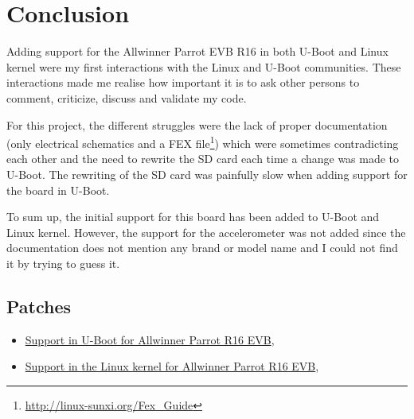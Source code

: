 \section{Conclusion}

Adding support for the Allwinner Parrot EVB R16 in both U-Boot and Linux kernel were my first interactions with the Linux and U-Boot communities. These interactions made me realise how important it is to ask other persons to comment, criticize, discuss and validate my code.

For this project, the different struggles were the lack of proper documentation (only electrical schematics and a FEX file\footnote{\url{http://linux-sunxi.org/Fex\_Guide}}) which were sometimes contradicting each other and the need to rewrite the SD card each time a change was made to U-Boot. The rewriting of the SD card was painfully slow when adding support for the board in U-Boot.

To sum up, the initial support for this board has been added to U-Boot and Linux kernel. However, the support for the accelerometer was not added since the documentation does not mention any brand or model name and I could not find it by trying to guess it.

\subsection*{Patches}

\begin{itemize}
  \item \href{http://lists.denx.de/pipermail/u-boot/2016-June/258992.html}{Support in U-Boot for Allwinner Parrot R16 EVB},
  \item \href{https://patchwork.kernel.org/patch/9197239/}{Support in the Linux kernel for Allwinner Parrot R16 EVB},
\end{itemize}
